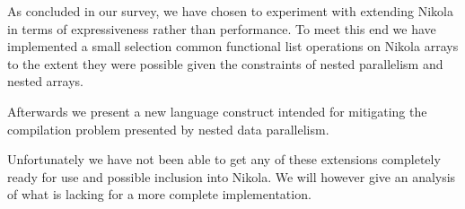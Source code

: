 
As concluded in our survey, we have chosen to experiment with extending Nikola
in terms of expressiveness rather than performance.  To meet this end we have
implemented a small selection common functional list operations on Nikola
arrays to the extent they were possible given the constraints of nested
parallelism and nested arrays.

Afterwards we present a new language construct intended for
mitigating the compilation problem presented by nested data parallelism.

Unfortunately we have not been able to get any of these extensions completely
ready for use and possible inclusion into Nikola. We will however give an
analysis of what is lacking for a more complete implementation.

